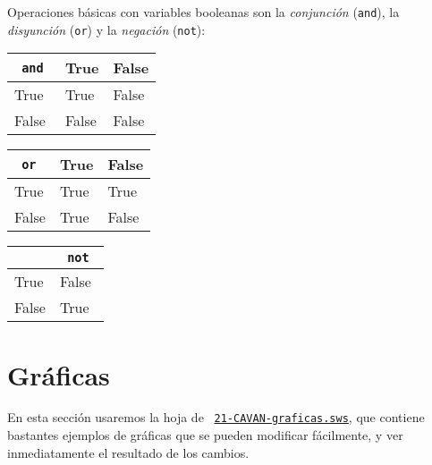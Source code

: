\noindent\begin{minipage}{1\textwidth}
Operaciones básicas con variables booleanas son la \emph{conjunción}
(\lstinline|and|),
la \emph{disyunción} (\lstinline|or|) y la \emph{negación} (\lstinline|not|):

\mbox{}\hfill
\small
\begin{tabular}{*3{|l}|}
\hline
 \lstinline| and | & True & False\\
 \hline
 True & True & False\\
 \hline
 False & False & False\\
 \hline
\end{tabular}
\hfill
\begin{tabular}{*3{|l}|}
\hline
 \lstinline| or | & True & False\\
 \hline
 True & True & True\\
 \hline
 False & True & False\\
 \hline
\end{tabular}
\hfill
\begin{tabular}{*2{|l}|}
\hline
 & \lstinline| not | \\
 \hline
 True & False\\
 \hline
 False & True \\
 \hline
\end{tabular}
\hfill\mbox{}
\end{minipage}


\section{Gr\'aficas}

En esta secci\'on usaremos la hoja de {\sage} \ 
\href{http://sage.mat.uam.es:8888/home/pub/0/}{\tt 21-CAVAN-graficas.sws}, 
que contiene bastantes ejemplos de gr\'aficas que se pueden modificar
f\'acilmente,  y ver
inmediatamente el resultado de los cambios. 

\medskip

